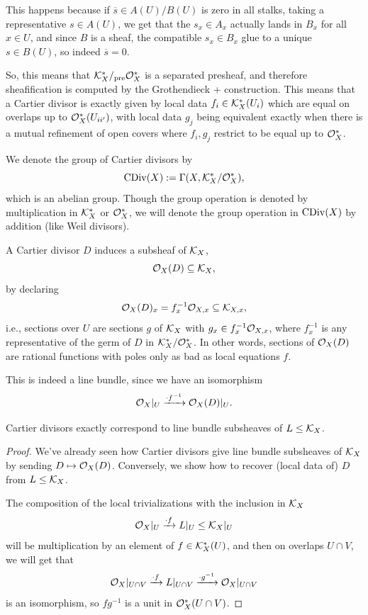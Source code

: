 \documentclass[12pt]{article}
\begin{document}
\begin{rmk}
    This happens because if $\overline{s} \in A(U)/B(U)$ is zero in all stalks, taking a representative $s\in A(U)$, we get that the $s_x \in A_x$ actually lands in $B_x$ for all $x\in U$, and since $B$ is a sheaf, the compatible $s_x\in B_x$ glue to a unique $s\in B(U)$, so indeed $\overline{s}=0$.

    So, this means that $\mathcal{K}_X^* /_{\mathrm{pre}} \mathcal{O}_X^*$ is a separated presheaf, and therefore sheafification is computed by the Grothendieck + construction. This means that a Cartier divisor is exactly given by local data $f_i \in \mathcal{K}_X^*(U_i)$ which are equal on overlaps up to $\mathcal{O}_X^*(U_{ii'})$, with local data $g_j$ being equivalent exactly when there is a mutual refinement of open covers where $f_i,g_j$ restrict to be equal up to $\mathcal{O}_X^*$.
\end{rmk}

\begin{defn}
    We denote the group of Cartier divisors by
    \[\operatorname{CDiv}(X) := \Gamma(X,\mathcal{K}_X^*/\mathcal{O}_X^*),\]
    which is an abelian group. Though the group operation is denoted by multiplication in $\mathcal{K}_X^*$ or $\mathcal{O}_X^*$, we will denote the group operation in $\operatorname{CDiv}(X)$ by addition (like Weil divisors).
\end{defn}

\begin{defn}
    A Cartier divisor $D$ induces a subsheaf of $\mathcal{K}_X$,
    \[\mathcal{O}_X(D) \subseteq \mathcal{K}_X,\]
    by declaring
    \[\mathcal{O}_X(D)_x = f_x^{-1} \mathcal{O}_{X,x} \subseteq \mathcal{K}_{X,x},\]
    i.e., sections over $U$ are sections $g$ of $\mathcal{K}_X$ with $g_x \in f_x^{-1}\mathcal{O}_{X,x}$, where $f_x^{-1}$ is any representative of the germ of $D$ in $\mathcal{K}_X^*/\mathcal{O}_X^*$. In other words, sections of $\mathcal{O}_X(D)$ are rational functions with poles only as bad as local equations $f$.

    This is indeed a line bundle, since we have an isomorphism
    \[\mathcal{O}_X|_U \xrightarrow{\cdot f^{-1}} \mathcal{O}_X(D)|_U.\]
\end{defn}

\begin{prop}
    Cartier divisors exactly correspond to line bundle subsheaves of $L \leq \mathcal{K}_X$.
\end{prop}
\begin{proof}
    We've already seen how Cartier divisors give line bundle subsheaves of $\mathcal{K}_X$ by sending $D\mapsto \mathcal{O}_X(D)$. Conversely, we show how to recover (local data of) $D$ from $L\leq \mathcal{K}_X$.
    
    The composition of the local trivializations with the inclusion in $\mathcal{K}_X$
    \[\mathcal{O}_X|_U \xrightarrow{\cdot f} L|_U \leq \mathcal{K}_X|_U\]
    will be multiplication by an element of $f\in \mathcal{K}_X^*(U)$, and then on overlaps $U\cap V$, we will get that
    \[\mathcal{O}_X|_{U\cap V} \xrightarrow{\cdot f} L|_{U\cap V} \xrightarrow{\cdot g^{-1}} \mathcal{O}_X|_{U\cap V}\]
    is an isomorphism, so $fg^{-1}$ is a unit in $\mathcal{O}_X^*(U\cap V)$.
\end{proof}
\end{document}
